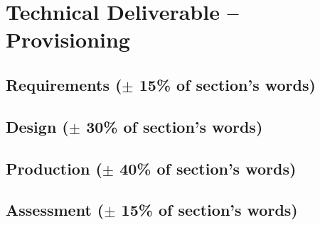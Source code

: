 \section{Technical Deliverable -- Provisioning}
% 
\subsection{Requirements ($\pm$ 15\% of section's words)}

\subsection{Design ($\pm$ 30\% of section's words)}

\subsection{Production ($\pm$ 40\% of section's words)}

\subsection{Assessment ($\pm$ 15\% of section's words)}

